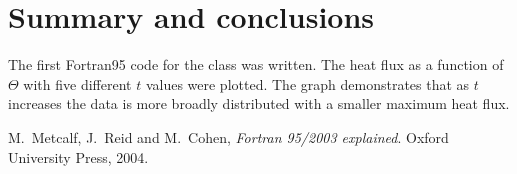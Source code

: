 \documentclass[12pt]{article}
\begin{document}
\section{Summary and conclusions}

The first Fortran95 code \cite{metcalf} for the class was written. The heat flux as a function of $\Theta$ with five different $t$ values were plotted. The graph demonstrates that as $t$ increases the data is more broadly distributed with a smaller maximum heat flux.

\begin{thebibliography}{}


 M.\ Metcalf, J.\ Reid and M.\ Cohen, {\it Fortran 95/2003 explained}. Oxford University Press, 2004.
 

\end{thebibliography}
\end{document}
